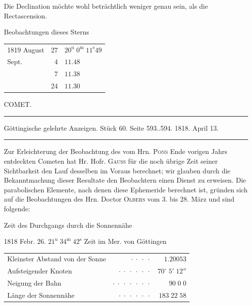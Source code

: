 \par\indent Die Declination möchte wohl beträchtlich weniger genau sein, als die
Rectascension.

\par\indent [Handschrift:] Beobachtungen dieses Sterns
\begin{center}\fontsize{10}{12}\selectfont\begin{tabular}{lrl}
1819 August & 27 & $20^{\mathrm u}\;0^{\mathrm m}\;11^{\mathrm s}49$\\
Sept. & 4 & $11.48$\\
& 7 & $11.38$\\
& 24 & $11.30$\\
\end{tabular}\end{center}

\clearpage{}\hypertarget{native-408-part-lower}{}\label{native-408-part-lower}
\begin{center}\large COMET.\end{center}
\begin{center}\hrule\vspace{4pt}\fontsize{10}{12}\selectfont Göttingische gelehrte Anzeigen. Stück 60. Seite 593..594. 1818. April 13.\par\vspace{4pt}\hrule\vspace{4pt}\end{center}
\par\indent Zur Erleichterung der Beobachtung des vom Hrn. \textsc{Pons} Ende vorigen Jahrs
entdeckten Cometen hat Hr. Hofr. \textsc{Gauss} für die noch übrige Zeit
seiner Sichtbarkeit den Lauf desselben im Voraus berechnet; wir glauben durch
die Bekanntmachung dieser Resultate den Beobachtern einen Dienst zu
erweisen. Die parabolischen Elemente, nach denen diese Ephemeride berechnet
ist, gründen sich auf die Beobachtungen des Hrn. Doctor \textsc{Olbers} vom
3. bis 28. März und sind folgende:

\begin{center}\fontsize{10}{12}\selectfont
Zeit des Durchgangs durch die Sonnennähe
\par 1818 Febr. 26. $21^{\mathrm u}\;34^{\mathrm m}\;42^{\mathrm s}$ Zeit im Mer. von Göttingen
\par\smallskip\begin{tabular}{lrr}
Kleinster Abstand von der Sonne & $\cdot\;\cdot\;\cdot\;\cdot$ & $1.20053$\\
Aufsteigender Knoten & $\cdot\;\cdot\;\cdot\;\cdot\;\cdot\;\cdot$ & $70^\circ\;5'\;12''$\\
Neigung der Bahn & $\cdot\;\cdot\;\cdot\;\cdot\;\cdot\;\cdot\;\cdot$ & $90\;0\;0$\\
Länge der Sonnennähe & $\cdot\;\cdot\;\cdot\;\cdot\;\cdot\;\cdot$ & $183\;22\;58$\\
\end{tabular}\end{center}

